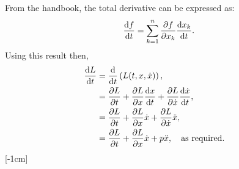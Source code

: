 From the handbook, the total derivative can be expressed as:
\[
	\deriv{f}{t} = \sum_{k=1}^n \pderiv{f}{x_k}\deriv{x_k}{t}.
\]
Using this result then,
\begin{align*}
	\deriv{L}{t} &= \deriv{}{t}\lr{L(t,x,\dot{x})},\\
	& = \pderiv{L}{t} + \pderiv{L}{x}\deriv{x}{t} + \pderiv{L}{\dot{x}}\deriv{\dot{x}}{t},\\
	&= \pderiv{L}{t} + \pderiv{L}{x}\dot{x} + \pderiv{L}{\dot{x}}\ddot{x},\\
	&= \pderiv{L}{t} + \pderiv{L}{x}\dot{x} + p\ddot{x},\qtq{as required.}
\end{align*}
[-1cm]
	
